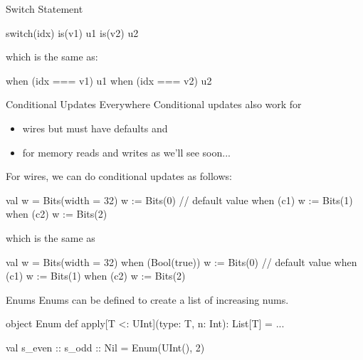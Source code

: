 \documentclass[xcolor=pdflatex,dvipsnames,table]{beamer}
\begin{document}
\begin{frame}[fragile]{Switch Statement}

\begin{scala}
switch(idx) {
  is(v1) { u1 }
  is(v2) { u2 }
}
\end{scala}

which is the same as:

\begin{scala}
when (idx === v1) { u1 }
when (idx === v2) { u2 }
\end{scala}

\end{frame}



\begin{frame}[fragile]{Conditional Updates Everywhere}
Conditional updates also work for 
\begin{itemize}
\item wires but must have defaults and
\item for memory reads and writes as we'll see soon...
\end{itemize}

For wires, we can do conditional updates as follows:

\begin{scala}
val w = Bits(width = 32)
w := Bits(0)                       // default value 
when (c1)         { w := Bits(1) }
when (c2)         { w := Bits(2) }
\end{scala}

\noindent
which is the same as

\begin{scala}
val w = Bits(width = 32)
when (Bool(true)) { w := Bits(0) } // default value
when (c1)         { w := Bits(1) }
when (c2)         { w := Bits(2) }
\end{scala}

\end{frame}

\begin{frame}[fragile]{Enums}
Enums can be defined to create a list of increasing nums.

\begin{scala}
object Enum {
  def apply[T <: UInt](type: T, n: Int): List[T] = ...
}
\end{scala}

\begin{scala}
val s_even :: s_odd :: Nil = Enum(UInt(), 2)
\end{scala}

\end{frame}
\end{document}
